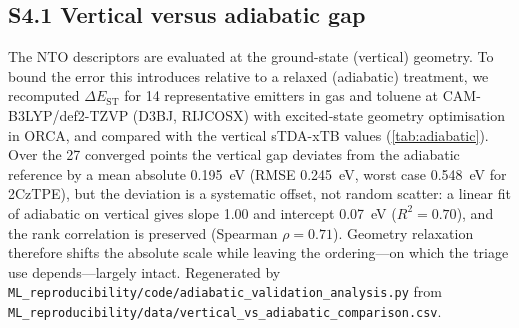 \documentclass[twoside,twocolumn,9pt]{extarticle}
\begin{document}
\subsection*{S4.1 Vertical versus adiabatic gap}
The NTO descriptors are evaluated at the ground-state (vertical) geometry. To bound
the error this introduces relative to a relaxed (adiabatic) treatment, we recomputed
$\Delta E_\text{ST}$ for \num{14} representative emitters in gas and toluene at
CAM-B3LYP/def2-TZVP (D3BJ, RIJCOSX) with excited-state geometry optimisation in
ORCA, and compared with the vertical sTDA-xTB values (\cref{tab:adiabatic}). Over the
\num{27} converged points the vertical gap deviates from the adiabatic reference by a
mean absolute \qty{0.195}{\electronvolt} (RMSE \qty{0.245}{\electronvolt}, worst case
\qty{0.548}{\electronvolt} for 2CzTPE), but the deviation is a systematic offset, not
random scatter: a linear fit of adiabatic on vertical gives slope \num{1.00} and
intercept \qty{0.07}{\electronvolt} ($R^2 = 0.70$), and the rank correlation is
preserved (Spearman $\rho = 0.71$). Geometry relaxation therefore shifts the absolute
scale while leaving the ordering---on which the triage use depends---largely intact.
Regenerated by \texttt{ML\_reproducibility/code/adiabatic\_validation\_analysis.py} from
\texttt{ML\_reproducibility/data/vertical\_vs\_adiabatic\_comparison.csv}.
\end{document}
